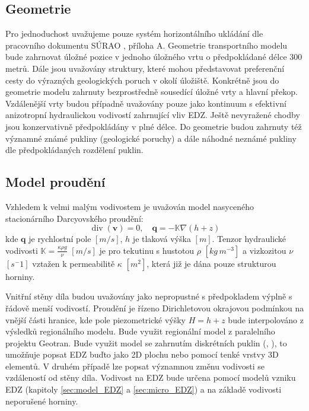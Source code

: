 \documentclass{article}
\def\grad{\nabla}
\def\div{\operatorname{div}}
\def\vc#1{\mathbf{\boldsymbol{#1}}}     %
\def\tn#1{{\mathbb{#1}}}    %
\begin{document}

\subsection{Geometrie}
\label{sec:transport_geometrie}
 Pro jednoduchost uvažujeme pouze systém horizontálního ukládání dle pracovního dokumentu SÚRAO , příloha A. 
 Geometrie transportního modelu bude zahrnovat úložné pozice v jednoho úložného vrtu o předpokládané délce 300 metrů. 
 Dále jsou uvažovány  struktury, které mohou představovat preferenční cesty do výrazných geologických poruch v okolí úložiště. 
 Konkrétně jsou do geometrie modelu zahrnuty bezprostředně sousedící úložné vrty a hlavní překop. Vzdálenější vrty budou případně 
 uvažovány pouze jako kontinuum s efektivní anizotropní hydraulickou vodivostí zahrnující vliv EDZ. 
Ještě nevyražené chodby jsou konzervativně předpokládány v plné délce. Do geometrie budou zahrnuty též významné známé pukliny 
(geologické poruchy) a dále náhodné neznámé pukliny dle předpokládaných rozdělení puklin.


\subsection{Model proudění}
\label{sec:transport_flow}
Vzhledem k velmi malým vodivostem je uvažován model nasyceného stacionárního Darcyovského proudění:
\[
    \div(\vc v) = 0, \quad \vc q = -\tn K \grad (h + z)
\]
kde $\vc q$ je rychlostní pole $[m/s]$, $h$ je tlaková výška $[m]$. Tenzor hydraulické vodivosti $\tn K =\frac{\kappa \rho g}{\nu}$
 $[m/s]$ je pro tekutinu s hustotou $\rho$ $[kg\, m^{-3}]$ a vizkozitou $\nu$ $[s^-1]$ vztažen k permeabilitě $\kappa$ $[m^2]$, která již je dána pouze strukturou horniny.

Vnitřní stěny díla budou uvažovány jako nepropustné s předpokladem výplně s řádově menší vodivostí. 
Proudění je řízeno Dirichletovou okrajovou podmínkou na vnější části hranice, kde pole piezometrické výšky $H = h + z$ 
bude interpolováno z výsledků regionálního modelu. Bude využit regionální model z paralelního projektu Geotran.
Bude využit model se zahrnutím diskrétních puklin (\cite{brezina_analysis_2015}, \cite{flow123d}), to umožňuje popsat EDZ buďto jako 2D plochu nebo pomocí 
tenké vrstvy 3D elementů. V druhém případě lze popsat významnou změnu vodivosti se vzdáleností od stěny díla.
Vodivost na EDZ bude určena pomocí modelů vzniku EDZ (kapitoly \ref{sec:model_EDZ} a \ref{sec:micro_EDZ}) 
a na základě vodivosti neporušené horniny.
\end{document}
